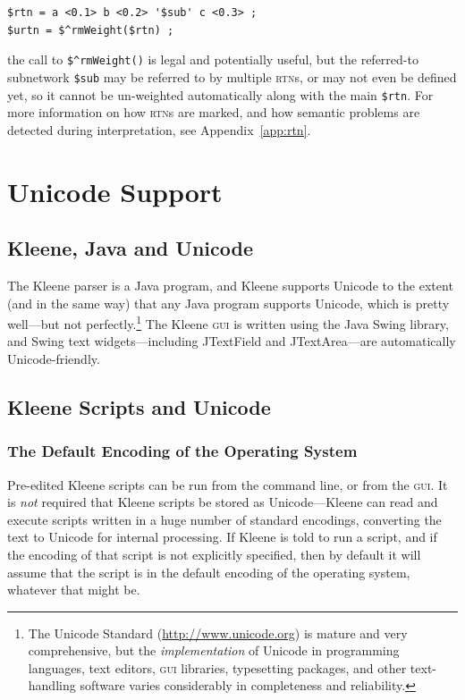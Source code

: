 \documentclass[letterpaper,12pt]{article}
\newcommand{\acro}{\textsc}
\begin{document}
\begin{Verbatim}[fontsize=\small]
$rtn = a <0.1> b <0.2> '$sub' c <0.3> ;
$urtn = $^rmWeight($rtn) ;
\end{Verbatim}

\noindent
the call to \verb!$^rmWeight()! is legal and potentially useful, but the
referred-to subnetwork \verb!$sub! may be referred
to by multiple \acro{rtn}s, or may not even be defined yet, so it cannot be
un-weighted automatically along with the main \verb!$rtn!.  For more
information on how \acro{rtn}s are marked, and how semantic problems are
detected during interpretation, see Appendix~\ref{app:rtn}.

\section{Unicode Support}

\subsection{Kleene, Java and Unicode}

The Kleene parser is a Java program, and Kleene supports Unicode to the extent (and
in the same way) that any Java program supports Unicode, which is pretty well---but
not perfectly.\footnote{The Unicode Standard (\url{http://www.unicode.org})
is mature and very comprehensive, but
the \emph{implementation} of Unicode in programming languages, 
text editors, \acro{gui} libraries,
typesetting packages, and other text-handling software varies considerably in completeness
and reliability.}  The
Kleene \acro{gui} is written using the Java Swing library, and Swing text
widgets---including JTextField and JTextArea---are automatically Unicode-friendly.  

\subsection{Kleene Scripts and Unicode}

\subsubsection{The Default Encoding of the Operating System}

Pre-edited Kleene scripts can be run from the command line, or from the \acro{gui}.
It is \emph{not} required that Kleene scripts be stored as Unicode---Kleene can
read and execute scripts written in a huge number of standard encodings, converting the text to Unicode for
internal processing.  If Kleene is told to run a script, and if the encoding of that script is not
explicitly specified, then by default it will assume that the script is in the
default encoding of the operating system, whatever that might be.
\end{document}
